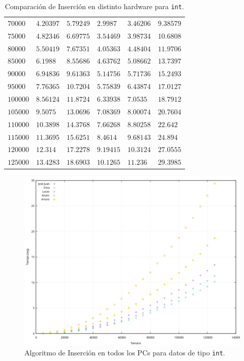 \documentclass[12pt]{article}
\begin{document}
\begin{table}
\begin{tabular}{|l|l|l|l|l|l|}
            $70000$ & $4.20397$ & $5.79249$ & $2.9987$ & $3.46206$ & $9.38579$ \\
            $75000$ & $4.82346$ & $6.69775$ & $3.54469$ & $3.98734$ & $10.6808$ \\
            $80000$ & $5.50419$ & $7.67351$ & $4.05363$ & $4.48404$ & $11.9706$ \\
            $85000$ & $6.1988$ & $8.55686$ & $4.63762$ & $5.08662$ & $13.7397$ \\
            $90000$ & $6.94836$ & $9.61363$ & $5.14756$ & $5.71736$ & $15.2493$ \\
            $95000$ & $7.76365$ & $10.7204$ & $5.75839$ & $6.43874$ & $17.0127$ \\
            $100000$ & $8.56124$ & $11.8724$ & $6.33938$ & $7.0535$ & $18.7912$ \\
            $105000$ & $9.5075$ & $13.0696$ & $7.08369$ & $8.00074$ & $20.7604$ \\
            $110000$ & $10.3898$ & $14.3768$ & $7.66268$ & $8.80258$ & $22.642$ \\
            $115000$ & $11.3695$ & $15.6251$ & $8.4614$ & $9.68143$ & $24.894$ \\
            $120000$ & $12.314$ & $17.2278$ & $9.19415$ & $10.3124$ & $27.0555$ \\
            $125000$ & $13.4283$ & $18.6903$ & \underline{$10.1265$} & $11.236$ & \underline{$29.3985$} \\
            \hline
        \end{tabular}
        \cprotect\caption{Comparación de Inserción en distinto hardware para \verb|int|.}
        \label{tab:comp_hardware_insercion}
    \end{table}
    \begin{figure}
        \centering
        \includegraphics[width=0.8\linewidth]{images/Comparaciones_hardware/Comparacion_hardware_insercion.png}
        \cprotect\caption{Algoritmo de Inserción en todos los PCs para datos de tipo \verb|int|.}
        \label{fig:CompHardwareInsercion}
    \end{figure}
\end{document}
